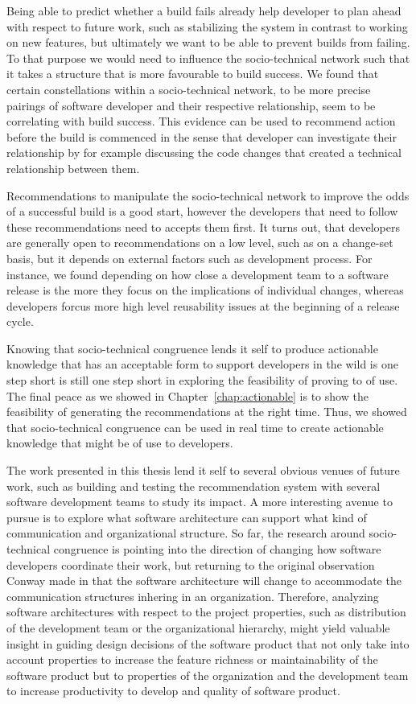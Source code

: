 Being able to predict whether a build fails already help developer to plan ahead with respect to future work, such as stabilizing the system in contrast to working on new features, but ultimately we want to be able to prevent builds from failing.
To that purpose we would need to influence the socio-technical network such that it takes a structure that is more favourable to build success.
We found that certain constellations within a socio-technical network, to be more precise pairings of software developer and their respective relationship, seem to be correlating with build success.
This evidence can be used to recommend action before the build is commenced in the sense that developer can investigate their relationship by for example discussing the code changes that created a technical relationship between them.

Recommendations to manipulate the socio-technical network to improve the odds of a successful build is a good start, however the developers that need to follow these recommendations need to accepts them first.
It turns out, that developers are generally open to recommendations on a low level, such as on a change-set basis, but it depends on external factors such as development process.
For instance, we found depending on how close a development team to a software release is the more they focus on the implications of individual changes, whereas developers forcus more high level reusability issues at the beginning of a release cycle.

Knowing that socio-technical congruence lends it self to produce actionable knowledge that has an acceptable form to support developers in the wild is one step short is still one step short in exploring the feasibility of proving to of use.
The final peace as we showed in Chapter~\ref{chap:actionable} is to show the feasibility of generating the recommendations at the right time.
Thus, we showed that socio-technical congruence can be used in real time to create actionable knowledge that might be of use to developers.

The work presented in this thesis lend it self to several obvious venues of future work, such as building and testing the recommendation system with several software development teams to study its impact.
A more interesting avenue to pursue is to explore what software architecture can support what kind of communication and organizational structure.
So far, the research around socio-technical congruence is pointing into the direction of changing how software developers coordinate their work, but returning to the original observation Conway made in that the software architecture will change to accommodate the communication structures inhering in an organization.
Therefore, analyzing software architectures with respect to the project properties, such as distribution of the development team or the organizational hierarchy, might yield valuable insight in guiding design decisions of the software product that not only take into account properties to increase the feature richness or maintainability of the software product but to properties of the organization and the development team to increase productivity to develop and quality of software product. 
